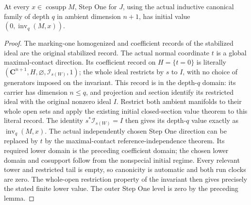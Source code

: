 \begin{lemma}
\label{hir:disjoint-zero-coordinate-initial-contact-value}
\leanok
At every $x\in\operatorname{cosupp}M$, Step One for $J$, using the actual
inductive canonical family of depth $q$ in ambient dimension $n+1$, has
initial value $(0,\operatorname{inv}_q(M,x))$.
\end{lemma}
\begin{proof}
The marking-one homogenized and coefficient records of the stabilized
ideal are the original stabilized record. The actual normal coordinate
$t$ is a global maximal-contact direction. Its coefficient record on
$H=\{t=0\}$ is literally
$(\mathbf C^{n+1},H,\varnothing,\mathcal I_{s(W)},1)$; the whole ideal
restricts by $s$ to $I$, with no choice of generators imposed on the invariant.
This record is in the depth-$q$ domain: its carrier has dimension $n\le q$,
and projection and section identify its restricted ideal with the original
nonzero ideal $I$. Restrict both ambient manifolds to their whole open sets
and apply the existing initial closed-section value theorem to this literal
record. The identity $s^*\mathcal I_{s(W)}=I$ then gives its depth-$q$ value
exactly as $\operatorname{inv}_q(M,x)$.
The actual independently chosen Step One direction can be replaced by $t$
by the maximal-contact reference-independence theorem. Its required lower
domain is the preceding coefficient domain; the chosen lower domain and
cosupport follow from the nonspecial initial regime. Every relevant tower
and restricted tail is empty, so canonicity is automatic and both run
clocks are zero. The whole-open restriction property of the invariant
then gives precisely the stated finite lower value. The outer Step One
level is zero by the preceding lemma.
\end{proof}

